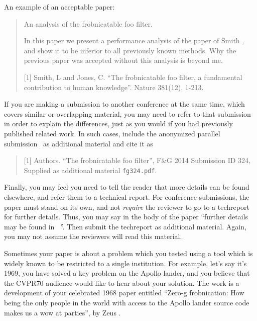 \documentclass[10pt,twocolumn,letterpaper]{article}
\begin{document}
An example of an acceptable paper:

\begin{quote}
\begin{center}
     An analysis of the frobnicatable foo filter.
\end{center}

   In this paper we present a performance analysis of the
   paper of Smith \etal [1], and show it to be inferior to
   all previously known methods.  Why the previous paper
   was accepted without this analysis is beyond me.

   [1] Smith, L and Jones, C. ``The frobnicatable foo
   filter, a fundamental contribution to human knowledge''.
   Nature 381(12), 1-213.
\end{quote}

If you are making a submission to another conference at the same time,
which covers similar or overlapping material, you may need to refer to that
submission in order to explain the differences, just as you would if you
had previously published related work.  In such cases, include the
anonymized parallel submission~ as additional material and
cite it as
\begin{quote}
[1] Authors. ``The frobnicatable foo filter'', F\&G 2014 Submission ID 324,
Supplied as additional material {\tt fg324.pdf}.
\end{quote}

Finally, you may feel you need to tell the reader that more details can be
found elsewhere, and refer them to a technical report.  For conference
submissions, the paper must stand on its own, and not {\em require} the
reviewer to go to a techreport for further details.  Thus, you may say in
the body of the paper ``further details may be found
in~ ''.  Then submit the techreport as additional material.
Again, you may not assume the reviewers will read this material. 

Sometimes your paper is about a problem which you tested using a tool which
is widely known to be restricted to a single institution.  For example,
let's say it's 1969, you have solved a key problem on the Apollo lander,
and you believe that the CVPR70 audience would like to hear about your
solution.  The work is a development of your celebrated 1968 paper entitled
``Zero-g frobnication: How being the only people in the world with access to
the Apollo lander source code makes us a wow at parties'', by Zeus \etal.
\end{document}
